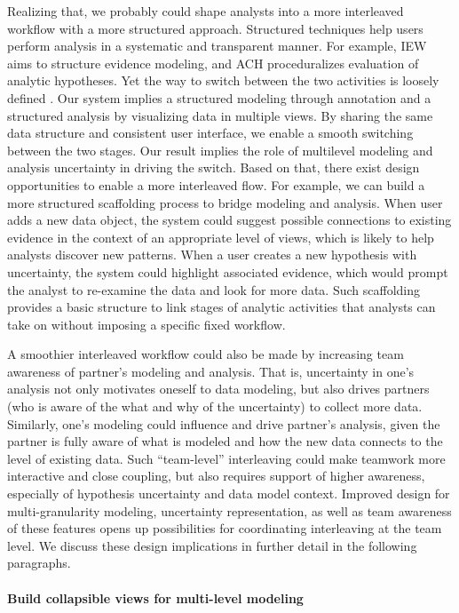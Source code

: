 Realizing that, we probably could shape analysts into a more interleaved
workflow with a more structured approach. Structured techniques help users
perform analysis in a systematic and transparent manner. For example, IEW aims
to structure evidence modeling, and ACH proceduralizes evaluation of analytic
hypotheses. Yet the way to switch between the two activities is loosely defined
\cite{Kang2011}. Our system implies a structured modeling through annotation and
a structured analysis by visualizing data in multiple views. By sharing the same
data structure and consistent user interface, we enable a smooth switching
between the two stages. Our result implies the role of multilevel modeling and
analysis uncertainty in driving the switch. Based on that, there exist design
opportunities to enable a more interleaved flow. For example, we can build a more structured scaffolding process to bridge modeling and analysis. When user adds a
new data object, the system could suggest possible connections to existing
evidence in the context of an appropriate level of views, which is likely to
help analysts discover new patterns. When a user creates a new hypothesis with
uncertainty, the system could highlight associated evidence, which would prompt
the analyst to re-examine the data and look for more data. Such scaffolding
provides a basic structure to link stages of analytic activities that analysts
can take on without imposing a specific fixed workflow.

A smoothier interleaved workflow could also be made by increasing team
awareness of partner's modeling and analysis. That is, uncertainty in one's
analysis not only motivates oneself to data modeling, but also drives partners
(who is aware of the what and why of the uncertainty) to collect more data.
Similarly, one's modeling could influence and drive partner's analysis, given
the partner is fully aware of what is modeled and how the new data connects to
the level of existing data. Such ``team-level'' interleaving could make teamwork
more interactive and close coupling, but also requires support of higher
awareness, especially of hypothesis uncertainty and data model context. Improved
design for multi-granularity modeling, uncertainty representation, as well as
team awareness of these features opens up possibilities for coordinating
interleaving at the team level. We discuss these design implications in further
detail in the following paragraphs.

\paragraph{Build collapsible views for multi-level modeling}


